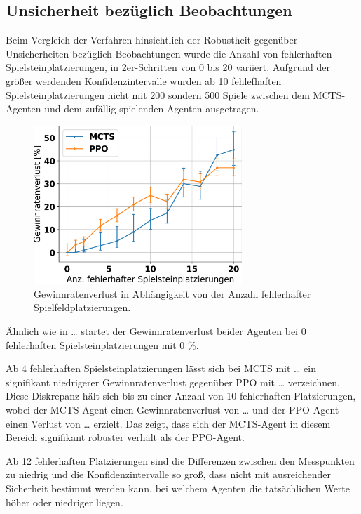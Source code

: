 \subsection{Unsicherheit bezüglich Beobachtungen}

Beim Vergleich der Verfahren hinsichtlich der Robustheit gegenüber Unsicherheiten bezüglich Beobachtungen wurde die Anzahl von fehlerhaften Spielsteinplatzierungen, in 2er-Schritten von 0 bis 20 variiert. Aufgrund der größer werdenden Konfidenzintervalle wurden ab 10 fehlefhaften Spielsteinplatzierungen nicht mit 200 sondern 500 Spiele zwischen dem MCTS-Agenten und dem zufällig spielenden Agenten ausgetragen.

\begin{figure}[ht!]%
	\includegraphics[width=0.7\textwidth, center]{Bilder/robustness-results/uncertain_observations_win_rate_losses.png}
	\caption{Gewinnratenverlust in Abhängigkeit von der Anzahl fehlerhafter Spielfeldplatzierungen.}
\end{figure}

Ähnlich wie in … startet der Gewinnratenverlust beider Agenten bei 0 fehlerhaften Spielsteinplatzierungen mit 0 \%.

Ab 4 fehlerhaften Spielsteinplatzierungen lässt sich bei MCTS mit … ein signifikant niedrigerer Gewinnratenverlust gegenüber PPO mit … verzeichnen. Diese Diskrepanz hält sich bis zu einer Anzahl von 10 fehlerhaften Platzierungen, wobei der MCTS-Agent einen Gewinnratenverlust von … und der PPO-Agent einen Verlust von … erzielt. Das zeigt, dass sich der MCTS-Agent in diesem Bereich signifikant robuster verhält als der PPO-Agent.

Ab 12 fehlerhaften Platzierungen sind die Differenzen zwischen den Messpunkten zu niedrig und die Konfidenzintervalle so groß, dass nicht mit ausreichender Sicherheit bestimmt werden kann, bei welchem Agenten die tatsächlichen Werte höher oder niedriger liegen.

